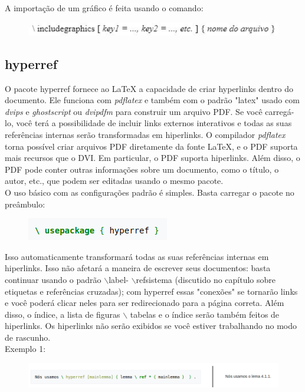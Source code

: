 \documentclass[12pt]{article}
\begin{document}
			A importação de um gráfico é feita usando o comando:
			
			
			\begin{figure}[!htb]
				\centering
				\includegraphics[scale=1.1]{20.JPG}
			\end{figure}
		
		
		\subsection{hyperref}
			O pacote hyperref fornece ao LaTeX a capacidade de criar hyperlinks dentro do documento. Ele funciona com \textit{pdflatex} e também com o padrão "latex" usado com \textit{dvips} e \textit{ghostscript} ou \textit{dvipdfm} para construir um arquivo PDF. Se você carregá-lo, você terá a possibilidade de incluir links externos interativos e todas as suas referências internas serão transformadas em hiperlinks. O compilador \textit{pdflatex} torna possível criar arquivos PDF diretamente da fonte LaTeX, e o PDF suporta mais recursos que o DVI. Em particular, o PDF suporta hiperlinks. Além disso, o PDF pode conter outras informações sobre um documento, como o título, o autor, etc., que podem ser editadas usando o mesmo pacote.\\
			O uso básico com as configurações padrão é simples. Basta carregar o pacote no preâmbulo:
			\begin{figure}[h]
				\centering
				\includegraphics[scale=0.6]{caa.png}
			\end{figure}
		
			Isso automaticamente transformará todas as suas referências internas em hiperlinks. Isso não afetará a maneira de escrever seus documentos: basta continuar usando o padrão $\backslash$label- $\backslash$refsistema (discutido no capítulo sobre etiquetas e referências cruzadas); com hyperref essas "conexões" se tornarão links e você poderá clicar neles para ser redirecionado para a página correta. 
			\newpage
			Além disso, o índice, a lista de figuras $\backslash$ tabelas e o índice serão também feitos de hiperlinks. Os hiperlinks não serão exibidos se você estiver trabalhando no modo de rascunho.\\
			Exemplo 1:
			\begin{figure}[h]
				\centering
				\includegraphics[scale=0.5]{ref.png}
			\end{figure}
		
\end{document}
